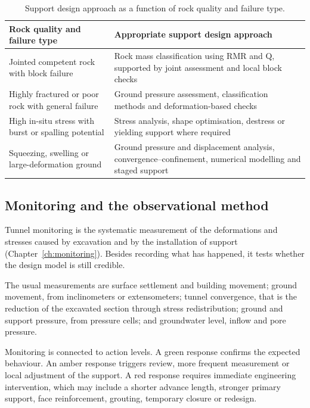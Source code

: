 \begin{table}[htbp]
\caption{Support design approach as a function of rock quality and failure type.}
\label{tab:support-approach-selection}
\centering
\small
\begin{tabularx}{\textwidth}{p{} X}
\toprule
\textbf{Rock quality and failure type} & \textbf{Appropriate support design approach} \\
\midrule
Jointed competent rock with block failure & Rock mass classification using RMR and Q, supported by joint assessment and local block checks \\
Highly fractured or poor rock with general failure & Ground pressure assessment, classification methods and deformation-based checks \\
High in-situ stress with burst or spalling potential & Stress analysis, shape optimisation, destress or yielding support where required \\
Squeezing, swelling or large-deformation ground & Ground pressure and displacement analysis, convergence--confinement, numerical modelling and staged support \\
\bottomrule
\end{tabularx}
\end{table}

\subsection{Monitoring and the observational method}
\label{sec:monitoring}

Tunnel monitoring is the systematic measurement of the deformations and
stresses caused by excavation and by the installation of support
(Chapter~\ref{ch:monitoring}). Besides recording what has happened,
it tests whether the design model is still credible.

The usual measurements are surface settlement and building movement; ground
movement, from inclinometers or extensometers; tunnel convergence, that is
the reduction of the excavated section through stress redistribution; ground
and support pressure, from pressure cells; and groundwater level, inflow and
pore pressure.

Monitoring is connected to action levels. A green response confirms the
expected behaviour. An amber response triggers review, more frequent
measurement or local adjustment of the support. A red response requires
immediate engineering intervention, which may include a shorter advance
length, stronger primary support, face reinforcement, grouting, temporary
closure or redesign.

